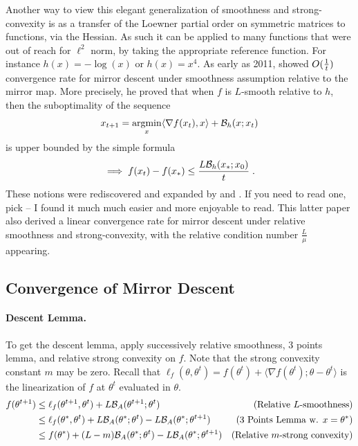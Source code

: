 \documentclass{article}
\newcommand{\logpart}{A}
\newcommand{\bregman}{\cB_\logpart}
\newcommand{\natp}{\theta}
\begin{document}
Another way to view this elegant generalization of smoothness and strong-convexity is as a transfer of the Loewner partial order on symmetric matrices to functions, via the Hessian. 
As such it can be applied to many functions that were out of reach for $\ell^2$ norm, by taking the appropriate reference function.  For instance $h(x) = -\log(x)$ or $h(x) = x^4$. 
As early as 2011, \citet{birnbaum2011distributed} showed $O(\frac{1}{t})$ convergence rate for mirror descent under smoothness assumption relative to the mirror map. 
More precisely, he proved that when $f$ is $L$-smooth relative to $h$, then the suboptimality of the sequence 
\begin{align}
	x_{t+1}  = \operatorname*{argmin}_x \langle \nabla f(x_t), x \rangle + {\mathcal B}_h(x ; x_t)
\end{align}
is upper bounded by the simple formula
\begin{align}
	\implies f(x_t) - f(x_*) \leq \frac{L {\mathcal B}_h(x_* ; x_0) }{t} \; .
\end{align}
These notions were rediscovered and expanded by \citet{bauschke2017descent} and \citet{lu2018relatively}. If you need to read one, pick \citet{lu2018relatively} -- I found it much much easier and more enjoyable to read.  This latter paper also derived a linear convergence rate for mirror descent under relative smoothness and strong-convexity, with the relative condition number $\frac{L}{\mu}$ appearing.


\subsection{Convergence of Mirror Descent}
\paragraph{Descent Lemma.}
To get the descent lemma, apply successively relative smoothness, 3 points lemma, and relative strong convexity on $f$. Note that the strong convexity constant $m$ may be zero. Recall that $\ell_f(\natp, \natp^{t}) = f(\natp^t) + \langle \nabla f (\natp^t) ; \natp - \natp^t \rangle $ is the linearization of $f$ at $\natp^t$ evaluated in $\natp$. 
\begin{align}
	f(\natp^{t+1}) 
	&\leq \ell_f(\natp^{t+1}, \natp^{t})  + L \bregman(\natp^{t+1}; \natp^{t})
	& \text{(Relative $L$-smoothness)} \\
	& \leq \ell_f(\natp^{*}, \natp^{t})  + L \bregman(\natp^{*}; \natp^{t}) -L \bregman(\natp^{*}; \natp^{t+1}) 
	& \text{(3 Points Lemma w. $x=\natp^*$)} \\
	& \leq f(\natp^*) + (L - m) \bregman(\natp^{*}; \natp^{t}) -L \bregman(\natp^{*}; \natp^{t+1}) 
	& \text{(Relative $m$-strong convexity)}
\end{align}
\end{document}
